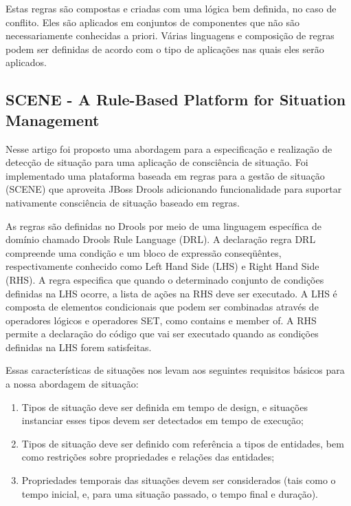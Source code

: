 \documentclass[12pt,a4paper,compsoc]{IEEEtran}
\begin{document}
  Estas regras são compostas e criadas com uma lógica bem definida, no caso de conflito. Eles são
  aplicados em conjuntos de componentes que não são necessariamente conhecidas a priori. Várias
  linguagens e composição de regras podem ser definidas de acordo com o tipo de aplicações nas
  quais eles serão aplicados.


\subsection{SCENE - A Rule-Based Platform for Situation Management}

  Nesse artigo foi proposto uma abordagem para a especificação e realização de detecção de situação
  para uma aplicação de consciência de situação. Foi implementado uma plataforma baseada em regras
  para a gestão de situação (SCENE) que aproveita JBoss Drools adicionando funcionalidade para
  suportar nativamente consciência de situação baseado em regras.
  
  As regras são definidas no Drools por meio de uma linguagem específica de domínio chamado Drools
  Rule Language (DRL). A declaração regra DRL compreende uma condição e um bloco de expressão
  conseqüêntes, respectivamente conhecido como  Left Hand Side (LHS) e Right Hand Side (RHS). A
  regra especifica que quando o determinado conjunto de condições definidas na LHS ocorre, a lista
  de ações na RHS deve ser executado. A LHS é composta de elementos condicionais que podem ser
  combinadas através de operadores lógicos e operadores SET, como  contains e member of. A RHS
  permite a declaração do código que vai ser executado quando as condições definidas na LHS forem
  satisfeitas.
  
  Essas características de situações nos levam aos seguintes requisitos básicos para a nossa
  abordagem de situação:
  \begin{enumerate}
    \item Tipos de situação deve ser definida em tempo de design, e situações instanciar esses
    tipos devem ser detectados em tempo de execução;
    \item Tipos de situação deve ser definido com referência a tipos de entidades, bem como 
    restrições sobre propriedades e relações das entidades;
    \item Propriedades temporais das situações devem ser considerados (tais como o tempo inicial,
    e, para uma situação passado, o tempo final e duração).  
  \end{enumerate}
  
\end{document}
